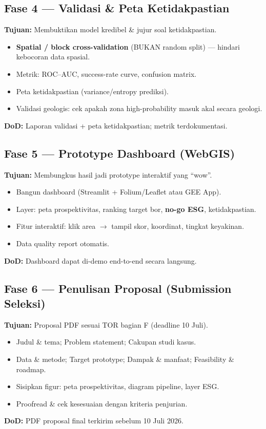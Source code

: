 \documentclass[11pt,a4paper]{article}
\newcommand{\todo}{\item[$\square$]}
\begin{document}
\subsection{Fase 4 --- Validasi \& Peta Ketidakpastian}
\textbf{Tujuan:} Membuktikan model kredibel \& jujur soal ketidakpastian.
\begin{itemize}[leftmargin=1.5em]
  \todo \textbf{Spatial / block cross-validation} (BUKAN random split) --- hindari kebocoran data spasial.
  \todo Metrik: ROC--AUC, success-rate curve, confusion matrix.
  \todo Peta ketidakpastian (variance/entropy prediksi).
  \todo Validasi geologis: cek apakah zona high-probability masuk akal secara geologi.
\end{itemize}
\textbf{DoD:} Laporan validasi + peta ketidakpastian; metrik terdokumentasi.

\subsection{Fase 5 --- Prototype Dashboard (WebGIS)}
\textbf{Tujuan:} Membungkus hasil jadi prototype interaktif yang ``wow''.
\begin{itemize}[leftmargin=1.5em]
  \todo Bangun dashboard (Streamlit + Folium/Leaflet atau GEE App).
  \todo Layer: peta prospektivitas, ranking target bor, \textbf{no-go ESG}, ketidakpastian.
  \todo Fitur interaktif: klik area $\rightarrow$ tampil skor, koordinat, tingkat keyakinan.
  \todo Data quality report otomatis.
\end{itemize}
\textbf{DoD:} Dashboard dapat di-demo end-to-end secara langsung.

\subsection{Fase 6 --- Penulisan Proposal (Submission Seleksi)}
\textbf{Tujuan:} Proposal PDF sesuai TOR bagian F (deadline 10 Juli).
\begin{itemize}[leftmargin=1.5em]
  \todo Judul \& tema; Problem statement; Cakupan studi kasus.
  \todo Data \& metode; Target prototype; Dampak \& manfaat; Feasibility \& roadmap.
  \todo Sisipkan figur: peta prospektivitas, diagram pipeline, layer ESG.
  \todo Proofread \& cek kesesuaian dengan kriteria penjurian.
\end{itemize}
\textbf{DoD:} PDF proposal final terkirim sebelum 10 Juli 2026.

\end{document}
